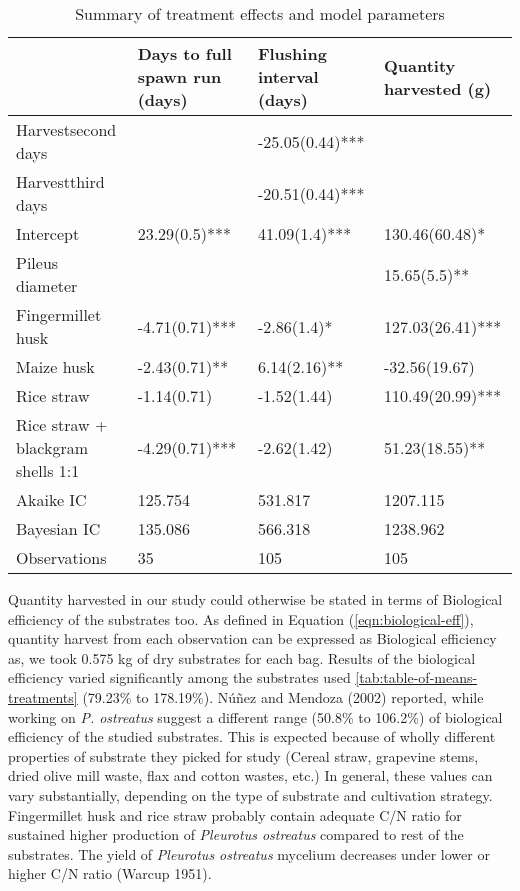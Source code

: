 \documentclass[]{article}
\begin{document}
\begingroup\fontsize{8}{10}\selectfont

\begin{longtable}[t]{llll}
\caption{\label{tab:qh-fsr-summary}Summary of treatment effects and model parameters}\\
\toprule
  & Days to full spawn run (days) & Flushing interval (days) & Quantity harvested (g)\\
\midrule
Harvestsecond days &  & -25.05(0.44)*** & \\
Harvestthird days &  & -20.51(0.44)*** & \\
Intercept & 23.29(0.5)*** & 41.09(1.4)*** & 130.46(60.48)*\\
Pileus diameter &  &  & 15.65(5.5)**\\
Fingermillet husk & -4.71(0.71)*** & -2.86(1.4)* & 127.03(26.41)***\\
\addlinespace
Maize husk & -2.43(0.71)** & 6.14(2.16)** & -32.56(19.67)\\
Rice straw & -1.14(0.71) & -1.52(1.44) & 110.49(20.99)***\\
Rice straw + blackgram shells 1:1 & -4.29(0.71)*** & -2.62(1.42) & 51.23(18.55)**\\
\hline
Akaike IC & 125.754 & 531.817 & 1207.115\\
Bayesian IC & 135.086 & 566.318 & 1238.962\\
\addlinespace
Observations & 35 & 105 & 105\\
\bottomrule
\end{longtable}
\endgroup{}

Quantity harvested in our study could otherwise be stated in terms of Biological efficiency of the substrates too. As defined in Equation (\ref{eqn:biological-eff}), quantity harvest from each observation can be expressed as Biological efficiency as, we took 0.575 kg of dry substrates for each bag. Results of the biological efficiency varied significantly among the substrates used \ref{tab:table-of-means-treatments} (79.23\% to 178.19\%). Núñez and Mendoza (2002) reported, while working on \textit{P. ostreatus} suggest a different range (50.8\% to 106.2\%) of biological efficiency of the studied substrates. This is expected because of wholly different properties of substrate they picked for study (Cereal straw, grapevine stems, dried olive mill waste, flax and cotton wastes, etc.) In general, these values can vary substantially, depending on the type of substrate and cultivation strategy. Fingermillet husk and rice straw probably contain adequate C/N ratio for sustained higher production of \textit{Pleurotus ostreatus} compared to rest of the substrates. The yield of \textit{Pleurotus ostreatus} mycelium decreases under lower or higher C/N ratio (Warcup 1951).
\end{document}
